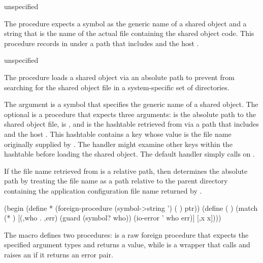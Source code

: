 \begin{procedure}
\end{procedure}
\returns{} unspecified

The  procedure expects a symbol
 as the generic name of a shared object and
a string  that is the
name of the actual file containing the shared object code.
This procedure records  in  under a
path that includes  and the host .

\begin{procedure}
\end{procedure}
\returns{} unspecified

The  procedure loads a shared object via an
absolute path to prevent  from searching for the
shared object file in a system-specific set of directories.

The  argument is a symbol that specifies the generic name of a
shared object.
The optional  is a procedure that expects three arguments:
 is the absolute path to the shared object file,
 is , and  is the hashtable
retrieved from  via a path that includes
 and the host .
This hashtable contains a key  whose value
is the file name originally supplied by .
The handler might examine other keys within the hashtable before
loading the shared object.
The default handler simply calls  on .

If the file name retrieved from  is a relative path,
then  determines the absolute path by
treating the file name as a path relative to the parent directory
containing the application configuration file name returned by .

\begin{syntax}
\end{syntax}
\expandsto{} \antipar\codebegin
(begin
  (define * (foreign-procedure (symbol->string ') ( \etc) ptr))
  (define (  \etc)
    (match (*  \etc)
      [(,who . ,err)
       (guard (symbol? who))
       (io-error ' who err)]
      [,x x])))
\codeend

The  macro defines two procedures: 
is a raw foreign procedure that expects the specified argument types and returns
a  value, while  is a wrapper that calls 
and raises an  if it returns an error pair.


